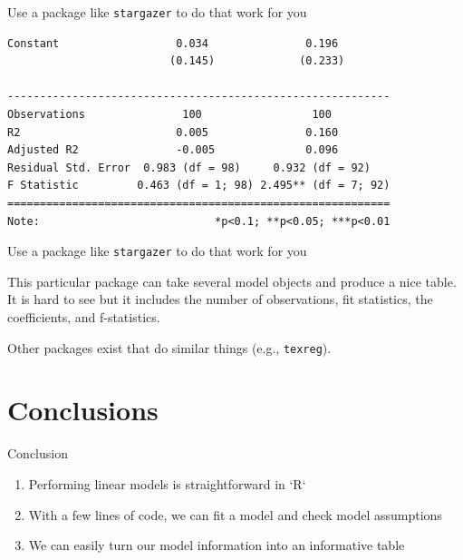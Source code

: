\begin{frame}[fragile]{Use a package like \texttt{stargazer} to do that
work for you}
\begin{verbatim}
Constant                  0.034               0.196        
                         (0.145)             (0.233)       
                                                           
-----------------------------------------------------------
Observations               100                 100         
R2                        0.005               0.160        
Adjusted R2               -0.005              0.096        
Residual Std. Error  0.983 (df = 98)     0.932 (df = 92)   
F Statistic         0.463 (df = 1; 98) 2.495** (df = 7; 92)
===========================================================
Note:                           *p<0.1; **p<0.05; ***p<0.01
\end{verbatim}

\end{frame}

\begin{frame}[fragile]{Use a package like \texttt{stargazer} to do that
work for you}

This particular package can take several model objects and produce a
nice table. It is hard to see but it includes the number of
observations, fit statistics, the coefficients, and f-statistics.

Other packages exist that do similar things (e.g., \texttt{texreg}).

\begin{Shaded}
\begin{Highlighting}[]
\NormalTok{(}
\end{Highlighting}
\end{Shaded}

\end{frame}

\section{Conclusions}\label{conclusions}

\begin{frame}{Conclusion}

\Large

\begin{enumerate}
\item Performing linear models is straightforward in `R`
\item With a few lines of code, we can fit a model and check model assumptions
\item We can easily turn our model information into an informative table
\end{enumerate}

\end{frame}

